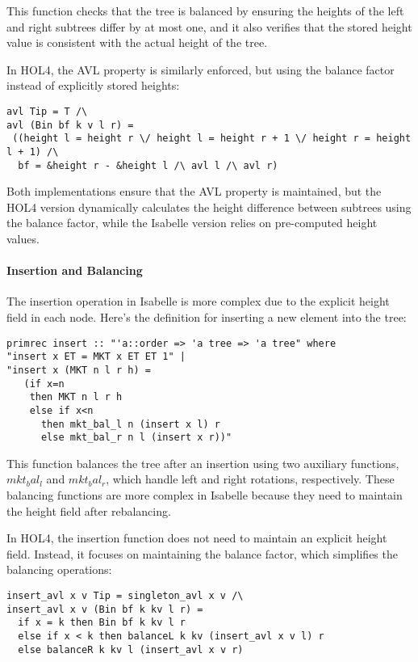 \documentclass[12pt]{article}
\begin{document}
This function checks that the tree is balanced by ensuring the heights of the left and right subtrees differ by at most one, and it also verifies that the stored height value is consistent with the actual height of the tree.

In HOL4, the AVL property is similarly enforced, but using the balance factor instead of explicitly stored heights:

\begin{verbatim}
avl Tip = T /\
avl (Bin bf k v l r) =
 ((height l = height r \/ height l = height r + 1 \/ height r = height l + 1) /\
  bf = &height r - &height l /\ avl l /\ avl r)
\end{verbatim}

Both implementations ensure that the AVL property is maintained, but the HOL4 version dynamically calculates the height difference between subtrees using the balance factor, while the Isabelle version relies on pre-computed height values.

\paragraph{Insertion and Balancing}

The insertion operation in Isabelle is more complex due to the explicit height field in each node. Here’s the definition for inserting a new element into the tree:

\begin{verbatim}
primrec insert :: "'a::order => 'a tree => 'a tree" where
"insert x ET = MKT x ET ET 1" |
"insert x (MKT n l r h) = 
   (if x=n
    then MKT n l r h
    else if x<n
      then mkt_bal_l n (insert x l) r
      else mkt_bal_r n l (insert x r))"
\end{verbatim}

This function balances the tree after an insertion using two auxiliary functions, \(mkt_bal_l\) and \(mkt_bal_r\), which handle left and right rotations, respectively. These balancing functions are more complex in Isabelle because they need to maintain the height field after rebalancing.

In HOL4, the insertion function does not need to maintain an explicit height field. Instead, it focuses on maintaining the balance factor, which simplifies the balancing operations:

\begin{verbatim}
insert_avl x v Tip = singleton_avl x v /\  
insert_avl x v (Bin bf k kv l r) =
  if x = k then Bin bf k kv l r  
  else if x < k then balanceL k kv (insert_avl x v l) r  
  else balanceR k kv l (insert_avl x v r)
\end{verbatim}
\end{document}
